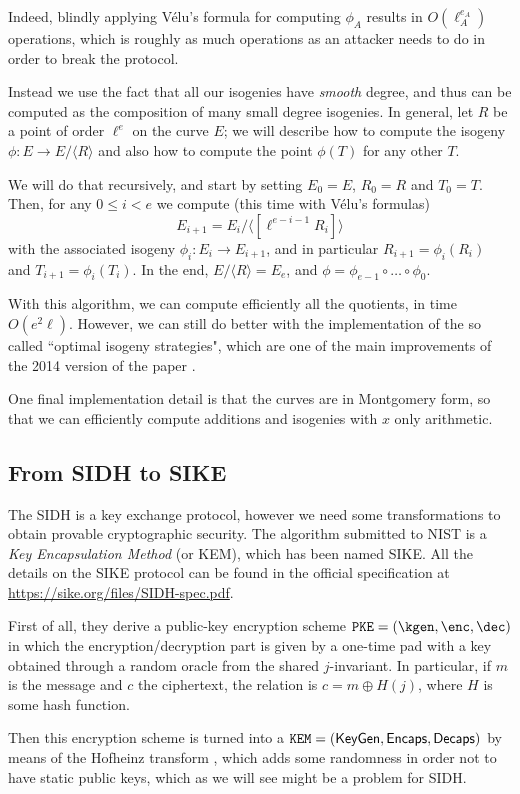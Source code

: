 Indeed, blindly applying Vélu's formula for computing $\phi_A$ results in $O(\ell_A^{e_A})$ operations, which is roughly as much operations as an attacker needs to do in order to break the protocol.

Instead we use the fact that all our isogenies have \emph{smooth} degree, and thus can be computed as the composition of many small degree isogenies. In general, let $R$ be a point of order $\ell^e$ on the curve $E$; we will describe how to compute the isogeny $\phi:E\to E/\langle R\rangle$ and also how to compute the point $\phi(T)$ for any other $T$.

We will do that recursively, and start by setting $E_0=E$, $R_0=R$ and $T_0=T$. Then, for any $0\le i<e$ we compute (this time with Vélu's formulas) $$E_{i+1}=E_i/\langle [\ell^{e-i-1}R_i] \rangle$$ with the associated isogeny $\phi_i:E_i\to E_{i+1}$, and in particular $R_{i+1}=\phi_i(R_i)$ and $T_{i+1}=\phi_i(T_i)$. In the end, $E/\langle R \rangle=E_e$, and $\phi=\phi_{e-1}\circ\dots\circ\phi_0$.

With this algorithm, we can compute efficiently all the quotients, in time $O(e^2\ell)$. However, we can still do better with the implementation of the so called ``optimal isogeny strategies", which are one of the main improvements of the 2014 version of the paper \cite{SIDH14}.

One final implementation detail is that the curves are in Montgomery form, so that we can efficiently compute additions and isogenies with $x$ only arithmetic.

\subsection{From SIDH to SIKE}
The SIDH is a key exchange protocol, however we need some transformations to obtain provable cryptographic security. The algorithm submitted to NIST is a \emph{Key Encapsulation Method} (or KEM), which has been named SIKE. All the details on the SIKE protocol can be found in the official specification at \url{https://sike.org/files/SIDH-spec.pdf}.

First of all, they derive a public-key encryption scheme $\texttt{PKE}=(\kgen,\enc,\dec)$ in which the encryption/decryption part is given by a one-time pad with a key obtained through a random oracle from the shared $j$-invariant. In particular, if $m$ is the message and $c$ the ciphertext, the relation is $c=m\oplus H(j)$, where $H$ is some hash function.

Then this encryption scheme is turned into a $\texttt{KEM}=(\mathsf{KeyGen}, \mathsf{Encaps}, \mathsf{Decaps})$ by means of the Hofheinz transform \cite{Hofheinz}, which adds some randomness in order not to have static public keys, which as we will see might be a problem for SIDH.

